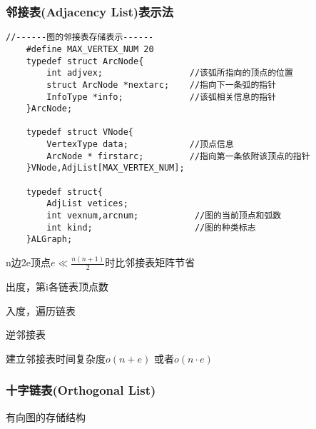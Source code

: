 \documentclass[UTF8]{ctexart}
\begin{document}
\newpage

\subsubsection{邻接表(Adjacency List)表示法}

\begin{lstlisting}[style=v1]
    //------图的邻接表存储表示------
    #define MAX_VERTEX_NUM 20
    typedef struct ArcNode{
        int adjvex;                 //该弧所指向的顶点的位置
        struct ArcNode *nextarc;    //指向下一条弧的指针
        InfoType *info;             //该弧相关信息的指针    
    }ArcNode;

    typedef struct VNode{
        VertexType data;            //顶点信息
        ArcNode * firstarc;         //指向第一条依附该顶点的指针    
    }VNode,AdjList[MAX_VERTEX_NUM];

    typedef struct{
        AdjList vetices;
        int vexnum,arcnum;           //图的当前顶点和弧数   
        int kind;                    //图的种类标志   
    }ALGraph;
\end{lstlisting}


n边2e顶点$e \ll \frac{n(n+1)}{2} $时比邻接表矩阵节省

出度，第i各链表顶点数

入度，遍历链表

逆邻接表

建立邻接表时间复杂度$o(n+e)$ 或者$o(n\cdot e)$


\subsubsection{十字链表(Orthogonal List)}

有向图的存储结构
\end{document}
